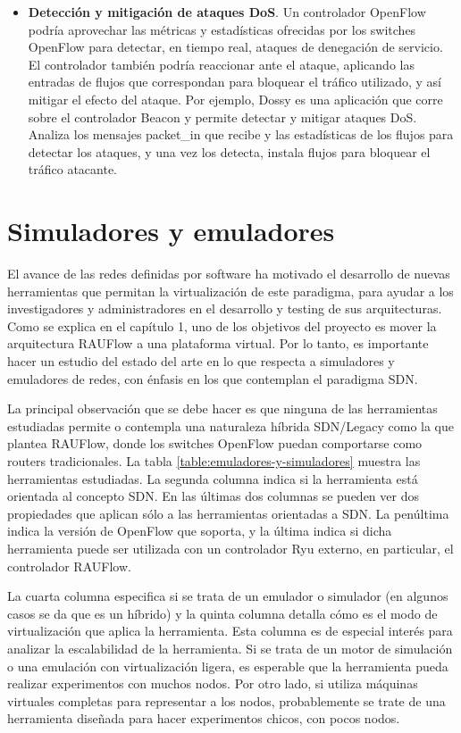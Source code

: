 \begin{itemize}
	\item \textbf{Detección y mitigación de ataques DoS}. Un controlador OpenFlow podría aprovechar las métricas y estadísticas ofrecidas por los switches OpenFlow para detectar, en tiempo real, ataques de denegación de servicio. El controlador también podría reaccionar ante el ataque, aplicando las entradas de flujos que correspondan para bloquear el tráfico utilizado, y así mitigar el efecto del ataque. Por ejemplo, Dossy \cite{openflow-dos-dossy} es una aplicación que corre sobre el controlador Beacon y permite detectar y mitigar ataques DoS. Analiza los mensajes packet\_in que recibe y las estadísticas de los flujos para detectar los ataques, y una vez los detecta, instala flujos para bloquear el tráfico atacante.
\end{itemize}

\section{Simuladores y emuladores}
El avance de las redes definidas por software ha motivado el desarrollo de nuevas herramientas que permitan la virtualización de este paradigma, para ayudar a los investigadores y administradores en el desarrollo y testing de sus arquitecturas. Como se explica en el capítulo 1, uno de los objetivos del proyecto es mover la arquitectura RAUFlow a una plataforma virtual. Por lo tanto, es importante hacer un estudio del estado del arte en lo que respecta a simuladores y emuladores de redes, con énfasis en los que contemplan el paradigma SDN.

La principal observación que se debe hacer es que ninguna de las herramientas estudiadas permite o contempla una naturaleza híbrida SDN/Legacy como la que plantea RAUFlow, donde los switches OpenFlow puedan comportarse como routers tradicionales. La tabla \ref{table:emuladores-y-simuladores} muestra las herramientas estudiadas. La segunda columna indica si la herramienta está orientada al concepto SDN. En las últimas dos columnas se pueden ver dos propiedades que aplican sólo a las herramientas orientadas a SDN. La penúltima indica la versión de OpenFlow que soporta, y la última indica si dicha herramienta puede ser utilizada con un controlador Ryu externo, en particular, el controlador RAUFlow.

La cuarta columna especifica si se trata de un emulador o simulador (en algunos casos se da que es un híbrido) y la quinta columna detalla cómo es el modo de virtualización que aplica la herramienta. Esta columna es de especial interés para analizar la escalabilidad de la herramienta. Si se trata de un motor de simulación o una emulación con virtualización ligera, es esperable que la herramienta pueda realizar experimentos con muchos nodos. Por otro lado, si utiliza máquinas virtuales completas para representar a los nodos, probablemente se trate de una herramienta diseñada para hacer experimentos chicos, con pocos nodos.

